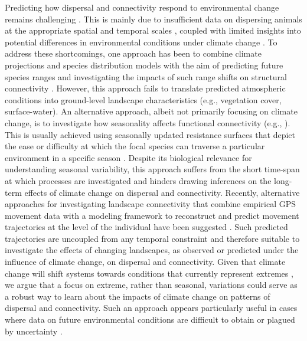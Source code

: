 \documentclass[../FinalThesis.tex]{subfiles}
\begin{document}
Predicting how dispersal and connectivity respond to environmental change
remains challenging \citep{Littlefield.2019}. This is mainly due to insufficient
data on dispersing animals at the appropriate spatial and temporal scales
\citep{Graves.2014, Vasudev.2015}, coupled with limited insights into potential
differences in environmental conditions under climate change
\citep{Scheiter.2009, IPCC.2022}. To address these shortcomings, one approach
has been to combine climate projections and species distribution models with the
aim of predicting future species ranges and investigating the impacts of such
range shifts on structural connectivity \citep{Wasserman.2012, Ashrafzadeh.2019,
Luo.2021}. However, this approach fails to translate predicted atmospheric
conditions into ground-level landscape characteristics (e.g., vegetation cover,
surface-water). An alternative approach, albeit not primarily focusing on
climate change, is to investigate how seasonality affects functional
connectivity (e.g., \citealp{Mui.2017, Osipova.2019, Zeller.2020, Kaszta.2021}).
This is usually achieved using seasonally updated resistance surfaces that
depict the ease or difficulty at which the focal species can traverse a
particular environment in a specific season \citep{Zeller.2012}. Despite its
biological relevance for understanding seasonal variability, this approach
suffers from the short time-span at which processes are investigated and hinders
drawing inferences on the long-term effects of climate change on dispersal and
connectivity. Recently, alternative approaches for investigating landscape
connectivity that combine empirical GPS movement data with a modeling framework
to reconstruct and predict movement trajectories at the level of the individual
have been suggested \citep{Signer.2017, Hofmann.2023, Signer.2024}. Such
predicted trajectories are uncoupled from any temporal constraint and therefore
suitable to investigate the effects of changing landscapes, as observed or
predicted under the influence of climate change, on dispersal and connectivity.
Given that climate change will shift systems towards conditions that currently
represent extremes \citep{Stott.2016, Ummenhofer.2017, IPCC.2022}, we argue that
a focus on extreme, rather than seasonal, variations could serve as a robust way
to learn about the impacts of climate change on patterns of dispersal and
connectivity. Such an approach appears particularly useful in cases where data
on future environmental conditions are difficult to obtain or plagued by
uncertainty \citep{Collins.2012}.
\end{document}
